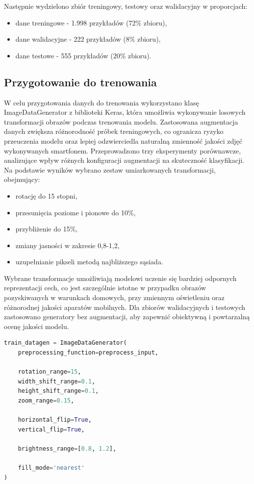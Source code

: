 Następnie wydzielono zbiór treningowy, testowy oraz walidacyjny w proporcjach:
\begin{itemize}
	\item dane treningowe - 1.998 przykładów (72\% zbioru),
	\item dane walidacyjne - 222 przykładów (8\% zbioru),
	\item dane testowe - 555 przykładów (20\% zbioru).
\end{itemize}

\subsection{Przygotowanie do trenowania}
W celu przygotowania danych do trenowania wykorzystano klasę ImageDataGenerator z biblioteki Keras, która umożliwia wykonywanie losowych transformacji obrazów podczas trenowania modelu.
Zastosowana augmentacja danych zwiększa różnorodność próbek treningowych, co ogranicza ryzyko przeuczenia modelu oraz lepiej odzwierciedla naturalną zmienność jakości zdjęć wykonywanych smartfonem.
Przeprowadzono trzy eksperymenty porównawcze, analizujące wpływ różnych konfiguracji augmentacji na skuteczność klasyfikacji.
Na podstawie wyników wybrano zestaw umiarkowanych transformacji, obejmujący:
\begin{itemize}
	\item rotację do 15 stopni,
	\item przesunięcia poziome i pionowe do 10\%,
	\item przybliżenie do 15\%,
	\item zmiany jasności w zakresie 0,8-1,2,
	\item uzupełnianie pikseli metodą najbliższego sąsiada.
\end{itemize}

Wybrane transformacje umożliwiają modelowi uczenie się bardziej odpornych reprezentacji cech, co jest szczególnie istotne w przypadku obrazów pozyskiwanych w warunkach domowych, przy zmiennym oświetleniu oraz różnorodnej jakości aparatów mobilnych.
Dla zbiorów walidacyjnych i testowych zastosowano generatory bez augmentacji, aby zapewnić obiektywną i powtarzalną ocenę jakości modelu.

\begin{lstlisting}[language=Python, caption=Definicja ImageDataGenerator dla klasy treningowej]
train_datagen = ImageDataGenerator(
	preprocessing_function=preprocess_input,

	rotation_range=15,
	width_shift_range=0.1,
	height_shift_range=0.1,
	zoom_range=0.15,

	horizontal_flip=True,
	vertical_flip=True,

	brightness_range=[0.8, 1.2],

	fill_mode='nearest'
)
\end{lstlisting}

